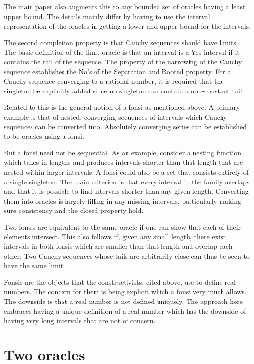 \documentclass[12pt]{article}
\theoremstyle{remark}
\begin{document}
The main paper also augments this to any bounded set of oracles having a least upper bound. The details mainly differ by having to use the interval representation of the oracles in getting a lower and upper bound for the intervals. 

The second completion property is that Cauchy sequences should have limits. The basic definition of the limit oracle is that an interval is a Yes interval if it contains the tail of the sequence. The property of the narrowing of the Cauchy sequence establishes the No's of the Separation and Rooted property. For a Cauchy sequence converging to a rational number, it is required that the singleton be explicitly added since no singleton can contain a non-constant tail.

Related to this is the general notion of a fonsi as mentioned above. A primary example is that of nested, converging sequences of intervals which Cauchy sequences can be converted into. Absolutely converging series can be established to be oracles using a fonsi. 

But a fonsi need not be sequential. As an example, consider a nesting function which takes in lengths and produces intervals shorter than that length that are nested within larger intervals. A fonsi could also be a set that consists entirely of a single singleton. The main criterion is that every interval in the family overlaps and that it is possible to find intervals shorter than any given length. Converting them into oracles is largely filling in any missing intervals, particularly making sure consistency and the closed property hold.  

Two fonsis are equivalent to the same oracle if one can show that each of their elements intersect. This also follows if, given any small length, there exist intervals in both fonsis which are smaller than that length and overlap each other. Two Cauchy sequences whose tails are arbitrarily close can thus be seen to have the same limit. 

Fonsis are the objects that the constructivists, cited above, use to define real numbers. The concern for them is being explicit which a fonsi very much allows. The downside is that a real number is not defined uniquely. The approach here embraces having a unique definition of a real number which has the downside of having very long intervals that are not of concern. 

\section{Two oracles}
\end{document}

